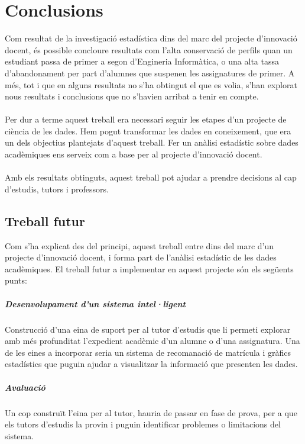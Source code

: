 \documentclass[12pt,a4paper,catalan]{article}
\begin{document}
\newpage
\section{Conclusions}
Com resultat de la investigació estadística dins del marc del projecte d'innovació docent, és possible concloure resultats com l'alta conservació de perfils quan un estudiant passa de primer a segon d'Engineria Informàtica, o una alta tassa d'abandonament per part d'alumnes que suspenen les assignatures de primer. A més, tot i que en alguns resultats no s'ha obtingut el que es volia, s'han explorat nous resultats i conclusions que no s'havien arribat a tenir en compte.
\\
\\
Per dur a terme aquest treball era necessari seguir les etapes d'un projecte de ciència de les dades. Hem pogut transformar les dades en coneixement, que era un dels objectius plantejats d'aquest treball. Fer un anàlisi estadístic sobre dades acadèmiques ens serveix com a base per al projecte d'innovació docent.
\\
\\
Amb els resultats obtinguts, aquest treball pot ajudar a prendre decisions al cap d'estudis, tutors i professors.

\subsection{Treball futur}
Com s'ha explicat des del principi, aquest treball entre dins del marc d'un projecte d'innovació docent, i forma part de l'anàlisi estadístic de les dades acadèmiques. El treball futur a implementar en aquest projecte són els següents punts:

\subparagraph{Desenvolupament d'un sistema intel·ligent} 
Construcció d'una eina de suport per al tutor d'estudis que li permeti explorar amb més profunditat l'expedient acadèmic d'un alumne o d'una assignatura. Una de les eines a incorporar seria un sistema de recomanació de matrícula i gràfics estadístics que puguin ajudar a visualitzar la informació que presenten les dades.

\subparagraph{Avaluació}
Un cop construït l'eina per al tutor, hauria de passar en fase de prova, per a que els tutors d'estudis la provin i puguin identificar problemes o limitacions del sistema.

\newpage
\end{document}
